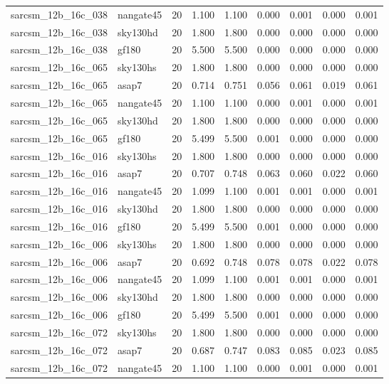 \begin{tabular}{llrrrrrrr}
sarcsm\_12b\_16c\_038 & nangate45 & 20 & 1.100 & 1.100 & 0.000 & 0.001 & 0.000 & 0.001 \\
sarcsm\_12b\_16c\_038 & sky130hd & 20 & 1.800 & 1.800 & 0.000 & 0.000 & 0.000 & 0.000 \\
sarcsm\_12b\_16c\_038 & gf180 & 20 & 5.500 & 5.500 & 0.000 & 0.000 & 0.000 & 0.000 \\
sarcsm\_12b\_16c\_065 & sky130hs & 20 & 1.800 & 1.800 & 0.000 & 0.000 & 0.000 & 0.000 \\
sarcsm\_12b\_16c\_065 & asap7 & 20 & 0.714 & 0.751 & 0.056 & 0.061 & 0.019 & 0.061 \\
sarcsm\_12b\_16c\_065 & nangate45 & 20 & 1.100 & 1.100 & 0.000 & 0.001 & 0.000 & 0.001 \\
sarcsm\_12b\_16c\_065 & sky130hd & 20 & 1.800 & 1.800 & 0.000 & 0.000 & 0.000 & 0.000 \\
sarcsm\_12b\_16c\_065 & gf180 & 20 & 5.499 & 5.500 & 0.001 & 0.000 & 0.000 & 0.000 \\
sarcsm\_12b\_16c\_016 & sky130hs & 20 & 1.800 & 1.800 & 0.000 & 0.000 & 0.000 & 0.000 \\
sarcsm\_12b\_16c\_016 & asap7 & 20 & 0.707 & 0.748 & 0.063 & 0.060 & 0.022 & 0.060 \\
sarcsm\_12b\_16c\_016 & nangate45 & 20 & 1.099 & 1.100 & 0.001 & 0.001 & 0.000 & 0.001 \\
sarcsm\_12b\_16c\_016 & sky130hd & 20 & 1.800 & 1.800 & 0.000 & 0.000 & 0.000 & 0.000 \\
sarcsm\_12b\_16c\_016 & gf180 & 20 & 5.499 & 5.500 & 0.001 & 0.000 & 0.000 & 0.000 \\
sarcsm\_12b\_16c\_006 & sky130hs & 20 & 1.800 & 1.800 & 0.000 & 0.000 & 0.000 & 0.000 \\
sarcsm\_12b\_16c\_006 & asap7 & 20 & 0.692 & 0.748 & 0.078 & 0.078 & 0.022 & 0.078 \\
sarcsm\_12b\_16c\_006 & nangate45 & 20 & 1.099 & 1.100 & 0.001 & 0.001 & 0.000 & 0.001 \\
sarcsm\_12b\_16c\_006 & sky130hd & 20 & 1.800 & 1.800 & 0.000 & 0.000 & 0.000 & 0.000 \\
sarcsm\_12b\_16c\_006 & gf180 & 20 & 5.499 & 5.500 & 0.001 & 0.000 & 0.000 & 0.000 \\
sarcsm\_12b\_16c\_072 & sky130hs & 20 & 1.800 & 1.800 & 0.000 & 0.000 & 0.000 & 0.000 \\
sarcsm\_12b\_16c\_072 & asap7 & 20 & 0.687 & 0.747 & 0.083 & 0.085 & 0.023 & 0.085 \\
sarcsm\_12b\_16c\_072 & nangate45 & 20 & 1.100 & 1.100 & 0.000 & 0.001 & 0.000 & 0.001 \\

\end{tabular}
